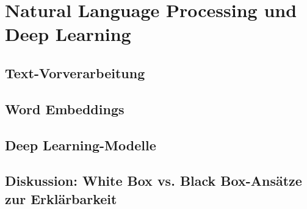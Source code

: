 \chapter{Natural Language Processing und Deep Learning}
\label{chap:nlp_und_deep_learning}

\section{Text-Vorverarbeitung}
\label{sec:text_vorverarbeitung}

\section{Word Embeddings}
\label{sec:word_embeddings}

\section{Deep Learning-Modelle}
\label{sec:deep_learning_modelle}

\section{Diskussion: White Box vs. Black Box-Ansätze zur Erklärbarkeit}
\label{sec:diskussion_erklaerbarkeit}